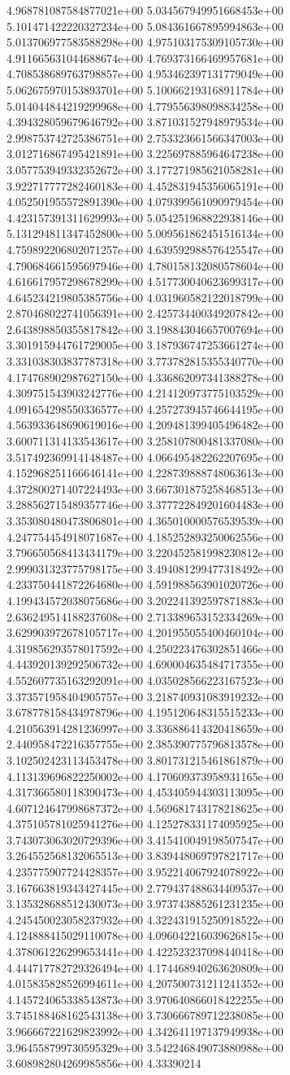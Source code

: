 	4.968781087584877021e+00	5.034567949951668453e+00	5.101471422220327234e+00	5.084361667895994863e+00	5.013706977583588298e+00	4.975103175309105730e+00	4.911665631044688674e+00	4.769373166469957681e+00	4.708538689763798857e+00	4.953462397131779049e+00	5.062675970153893701e+00	5.100662193168911784e+00	5.014044844219299968e+00	4.779556398098834258e+00	4.394328059679646792e+00	3.871031527948979534e+00	2.998753742725386751e+00	2.753323661566347003e+00	3.012716867495421891e+00	3.225697885964647238e+00	3.057753949332352672e+00	3.177271985621058281e+00	3.922717777282460183e+00	4.452831945356065191e+00	4.052501955572891390e+00	4.079399561090979454e+00	4.423157391311629993e+00	5.054251968822938146e+00	5.131294811347452800e+00	5.009561862451516134e+00	4.759892206802071257e+00	4.639592988576425547e+00	4.790684661595697946e+00	4.780158132080578604e+00	4.616617957298678299e+00	4.517730040623699317e+00	4.645234219805385756e+00	4.031960582122018799e+00	2.870468022741056391e+00	2.425734400349207842e+00	2.643898850355817842e+00	3.198843046657007694e+00	3.301915944761729005e+00	3.187936747253661274e+00	3.331038303837787318e+00	3.773782815355340770e+00	4.174768902987627150e+00	4.336862097341388278e+00	4.309751543903242776e+00	4.214120973775103529e+00	4.091654298550336577e+00	4.257273945746644195e+00	4.563933648690619016e+00	4.209481399405496482e+00	3.600711314133543617e+00	3.258107800481337080e+00	3.517492369914148487e+00	4.066495482262207695e+00	4.152968251166646141e+00	4.228739888748063613e+00	4.372800271407224493e+00	3.667301875258468513e+00	3.288562715489357746e+00	3.377722849201604483e+00	3.353080480473806801e+00	4.365010000576539539e+00	4.247754454918071687e+00	4.185252893250062556e+00	3.796650568413434179e+00	3.220452581998230812e+00	2.999031323775798175e+00	3.494081299477318492e+00	4.233750441872264680e+00	4.591988563901020726e+00	4.199434572038075686e+00	3.202241392597871883e+00	2.636249514188237608e+00	2.713389653152334269e+00	3.629903972678105717e+00	4.201955055400460104e+00	4.319856293578017592e+00	4.250223476302851466e+00	4.443920139292506732e+00	4.690004635484717355e+00	4.552607735163292091e+00	4.035028566223167523e+00	3.373571958404905757e+00	3.218740931083919232e+00	3.678778158434978796e+00	4.195120648315515233e+00	4.210563914281236997e+00	3.336886414320418659e+00	2.440958472216357755e+00	2.385390775796813578e+00	3.102502423113453478e+00	3.801731215461861879e+00	4.113139696822250002e+00	4.170609373958931165e+00	4.317366580118390473e+00	4.453405944303113095e+00	4.607124647998687372e+00	4.569681743178218625e+00	4.375105781025941276e+00	4.125278331174095925e+00	3.743073063020729396e+00	3.415410049198507547e+00	3.264552568132065513e+00	3.839448069797821717e+00	4.235775907724428357e+00	3.952214067924078922e+00	3.167663819343427445e+00	2.779437488634409537e+00	3.135328688512430073e+00	3.973743885261231235e+00	4.245450023058237932e+00	4.322431915250918522e+00	4.124888415029110078e+00	4.096042216039626815e+00	4.378061226299653441e+00	4.422523237098440418e+00	4.444717782729326494e+00	4.174468940263620809e+00	4.015835828526994611e+00	4.207500731211241352e+00	4.145724065338543873e+00	3.970640866018422255e+00	3.745188468162543138e+00	3.730666789712238085e+00	3.966667221629823992e+00	4.342641197137949938e+00	3.964558799730595329e+00	3.542246849073880988e+00	3.608982804269985856e+00	4.33390214